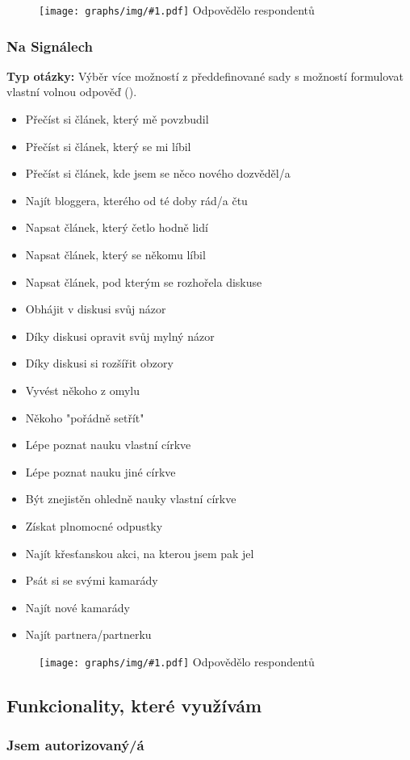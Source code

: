 \documentclass[12pt, a4paper, twoside]{article}
\newcommand{\answercount}[1]{Odpovědělo  respondentů}
\newcommand{\includegraph}[2]{
  \begin{figure}[H]
    \centering
    \textbf{#2}
    \texttt{[image: graphs/img/\#1.pdf]}
    \answercount{#1}
  \end{figure}
}
\newcommand{\qtype}{\textbf{Typ otázky:}
}
\newcommand{\pickMultiple}{Výběr více možností z předdefinované sady}
\newcommand{\withOther}{s možností formulovat vlastní volnou odpověď (\uv{Jiné})}
\begin{document}
\includegraph{signaly_jsem_vyuzil_k}{}

\subsubsection{Na Signálech }

\qtype \pickMultiple
\withOther.

\begin{itemize}
\item Přečíst si článek, který mě povzbudil
\item Přečíst si článek, který se mi líbil
\item Přečíst si článek, kde jsem se něco nového dozvěděl/a
\item Najít bloggera, kterého od té doby rád/a čtu
\item Napsat článek, který četlo hodně lidí
\item Napsat článek, který se někomu líbil
\item Napsat článek, pod kterým se rozhořela diskuse
\item Obhájit v diskusi svůj názor
\item Díky diskusi opravit svůj mylný názor
\item Díky diskusi si rozšířit obzory
\item Vyvést někoho z omylu
\item Někoho "pořádně setřít"
\item Lépe poznat nauku vlastní církve
\item Lépe poznat nauku jiné církve
\item Být znejistěn ohledně nauky vlastní církve
\item Získat plnomocné odpustky
\item Najít křesťanskou akci, na kterou jsem pak jel
\item Psát si se svými kamarády
\item Najít nové kamarády
\item Najít partnera/partnerku
\end{itemize}

\includegraph{na_signalech_se_mi_povedlo}{}

\subsection{Funkcionality, které využívám}\label{sec:funkcionality}

\subsubsection{Jsem autorizovaný/á}
\end{document}

